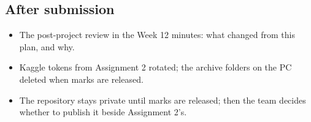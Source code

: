 \subsection{After submission}

\begin{itemize}
  \item The post-project review in the Week 12 minutes: what changed from this plan, and why.
  \item Kaggle tokens from Assignment 2 rotated; the archive folders on the PC deleted when marks
    are released.
  \item The repository stays private until marks are released; then the team decides whether to
    publish it beside Assignment 2's.
\end{itemize}
